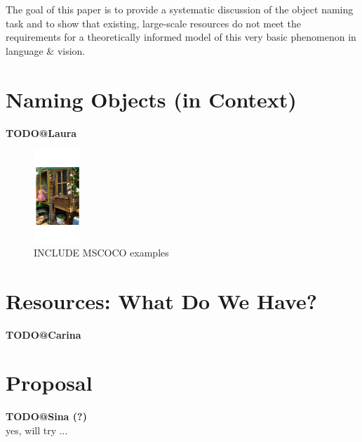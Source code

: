 \documentclass[runningheads]{llncs}
\begin{document}
The goal of this paper is to provide a systematic discussion of the object naming task and to show that existing, large-scale resources do not meet the requirements for a theoretically informed model of this very basic phenomenon in language \& vision.


\section{Naming Objects (in Context)}
\label{sec:object_naming}
\textbf{TODO@Laura}\\



\begin{figure}
	\centering
	\includegraphics[height=3.5cm]{fig/flickr_1000268201_boxes}
	\caption{INCLUDE MSCOCO examples}
	\label{fig:example}
\end{figure}

\section{Resources: What Do We Have?}
\label{sec:resources}
\textbf{TODO@Carina}\\



\section{Proposal}
\label{sec:future_proposal}
\textbf{TODO@Sina (?)}\\


yes, will try ...

\clearpage


\end{document}
